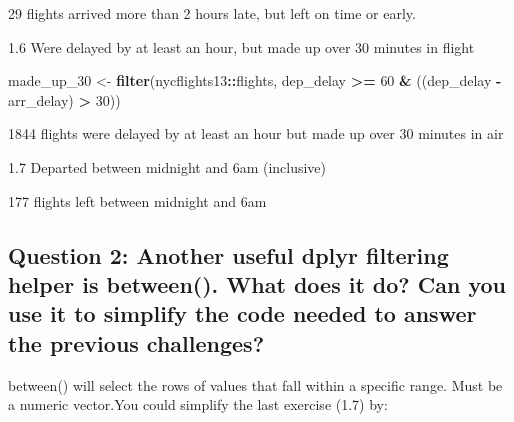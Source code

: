 \documentclass[
]{book}
\newenvironment{Shaded}{\begin{snugshade}}{\end{snugshade}}
\newcommand{\DecValTok}[1]{\textcolor[rgb]{0.00,0.00,0.81}{#1}}
\newcommand{\KeywordTok}[1]{\textcolor[rgb]{0.13,0.29,0.53}{\textbf{#1}}}
\newcommand{\NormalTok}[1]{#1}
\newcommand{\OperatorTok}[1]{\textcolor[rgb]{0.81,0.36,0.00}{\textbf{#1}}}
\newcommand{\StringTok}[1]{\textcolor[rgb]{0.31,0.60,0.02}{#1}}
\begin{document}
29 flights arrived more than 2 hours late, but left on time or early.

1.6 Were delayed by at least an hour, but made up over 30 minutes in flight

\begin{Shaded}
\begin{Highlighting}[]
\NormalTok{made_up_}\DecValTok{30}\NormalTok{ <-}\StringTok{ }\KeywordTok{filter}\NormalTok{(nycflights13}\OperatorTok{::}\NormalTok{flights, dep_delay }\OperatorTok{>=}\StringTok{ }\DecValTok{60} \OperatorTok{&}\StringTok{ }\NormalTok{((dep_delay }\OperatorTok{-}\StringTok{ }\NormalTok{arr_delay) }\OperatorTok{>}\StringTok{ }\DecValTok{30}\NormalTok{))}
\end{Highlighting}
\end{Shaded}

1844 flights were delayed by at least an hour but made up over 30 minutes in air

1.7 Departed between midnight and 6am (inclusive)

\begin{Shaded}
\end{Shaded}

177 flights left between midnight and 6am

\hypertarget{question-2-another-useful-dplyr-filtering-helper-is-between.-what-does-it-do-can-you-use-it-to-simplify-the-code-needed-to-answer-the-previous-challenges}{%
\subsection{Question 2: Another useful dplyr filtering helper is between(). What does it do? Can you use it to simplify the code needed to answer the previous challenges?}\label{question-2-another-useful-dplyr-filtering-helper-is-between.-what-does-it-do-can-you-use-it-to-simplify-the-code-needed-to-answer-the-previous-challenges}}

between() will select the rows of values that fall within a specific range. Must be a numeric vector.You could simplify the last exercise (1.7) by:
\end{document}
